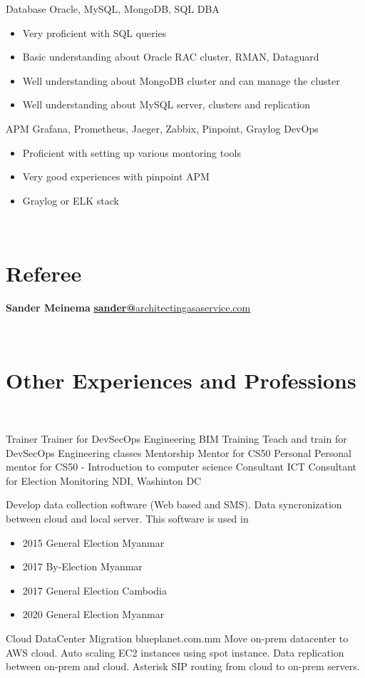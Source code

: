 \documentclass[]{friggeri-cv}
\begin{document}
\begin{entrylist}
{\begin{itemize}
    \end{itemize}}
  \entry
  {Database}
  {Oracle, MySQL, MongoDB, SQL}
  {DBA}
  { \begin{itemize}
      \item Very proficient with SQL queries
      \item Basic understanding about Oracle RAC cluster, RMAN, Dataguard
      \item Well understanding about MongoDB cluster and can manage the cluster
      \item Well understanding about MySQL server, clusters and replication
    \end{itemize}}
  \entry
  {APM}
  {Grafana, Prometheus, Jaeger, Zabbix, Pinpoint, Graylog}
  {DevOps}
  { \begin{itemize}
      \item Proficient with setting up various montoring tools
      \item Very good experiences with pinpoint APM
      \item Graylog or ELK stack
    \end{itemize}}
\end{entrylist}

\begin{aside}
  ~
  ~
  ~
  ~
  ~
  \section{Referee}
  \textbf{Sander Meinema}
  \href{mailto:sander@architectingasaservice.com}{\textbf{sander@}architectingasaservice.com}
\end{aside}
\newpage
~

\section{Other Experiences and Professions}
~
\begin{entrylist}
  \entry
  {Trainer}
  {Trainer for DevSecOps Engineering}
  {BIM Training}
  {Teach and train for DevSecOps Engineering classes}
  \entry
  {Mentorship}
  {Mentor for CS50}
  {Personal}
  {Personal mentor for CS50 - Introduction to computer science}
  \entry
  {Consultant}
  {ICT Consultant for Election Monitoring}
  {NDI, Washinton DC}
  {Develop data collection software (Web based and SMS). Data syncronization between cloud and local server. This software is used in 
    \begin{itemize}
      \item 2015 General Election Myanmar
      \item 2017 By-Election Myanmar
      \item 2017 General Election Cambodia
      \item 2020 General Election Myanmar
    \end{itemize}}
  \entry
  {Cloud}
  {DataCenter Migration}
  {blueplanet.com.mm}
  {Move on-prem datacenter to AWS cloud. Auto scaling EC2 instances using spot instance. Data replication between on-prem and cloud. Asterisk SIP routing from cloud to on-prem servers.\\}
\end{entrylist}
\end{document}

